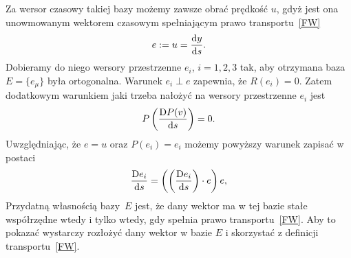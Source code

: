 Za wersor czasowy takiej bazy możemy zawsze obrać prędkość $u$, gdyż 
jest ona unowmowanym wektorem czasowym spełniającym 
prawo transportu~\eqref{FW}
\begin{align*}
e := u = \frac{\text{d} y}{\text{d} s}.
\end{align*}
Dobieramy do niego wersory 
przestrzenne $e_i$, $i=1,2,3$ tak, aby otrzymana baza $E=\{ e_\mu \}$ była
 ortogonalna.  Warunek $e_i \perp e$ zapewnia, że $R(e_i)=0$. 
Zatem dodatkowym warunkiem jaki trzeba nałożyć na wersory
przestrzenne $e_i$ jest 
\begin{align*}
P \left(\frac{\text{D} P(v)}{\text{d} s} \right)  = 0.
\end{align*} 
Uwzględniając, że $e=u$ oraz $P(e_i)=e_i$ możemy powyższy warunek
zapisać w postaci
\begin{align}\label{FWwkw}
\frac{\text{D} e_i }{\text{d} s} = 
\left( \left(\frac{\text{D} e_i }{\text{d} s}\right) \cdot e\right) e, 
\end{align}
Przydatną własnością bazy~$E$ jest, że dany wektor 
ma w tej bazie stałe współrzędne wtedy i tylko wtedy, gdy
spełnia prawo transportu~\eqref{FW}.
Aby to pokazać wystarczy rozłożyć dany wektor w bazie 
$E$ i skorzystać z definicji transportu~\eqref{FW}.

